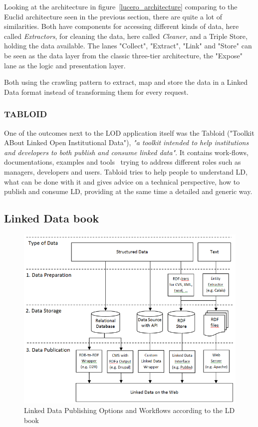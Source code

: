 Looking at the architecture in figure~\ref{lucero_architecture} comparing to the Euclid architecture seen in the previous section, there are quite a lot of similarities. Both have components for accessing different kinds of data, here called \emph{Extractors}, for cleaning the data, here called \emph{Cleaner}, and a Triple Store, holding the data available. The lanes "Collect", "Extract", "Link" and "Store" can be seen as the data layer from the classic three-tier architecture, the "Expose" lane as the logic and presentation layer. 

Both using the crawling pattern to extract, map and store the data in a Linked Data format instead of transforming them for every request.

\subsubsection{TABLOID}
One of the outcomes next to the LOD application itself was the Tabloid ("Toolkit ABout Linked Open Institutional Data"), \emph{"a toolkit intended to help institutions and developers to both publish and consume linked data"}. It contains work-flows, documentations, examples and tools~\cite{lucero:tabloid} trying to address different roles such as managers, developers and users. Tabloid tries to help people to understand LD, what can be done with it and gives advice on a technical perspective, how to publish and consume LD, providing at the same time a detailed and generic way.

\subsection{Linked Data book}

\begin{figure}[htbp]
	\centering
\includegraphics[width=\textwidth]{img/ld_architecture.png}
	\caption{Linked Data Publishing Options and Workflows according to the LD book}
	\label{ld_architecture}
\end{figure}

